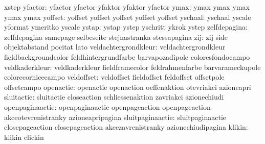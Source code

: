                           xstep                     %
                  yfactor: yfactor                   yfactor
                           yfaktor                   yfaktor
                           yfactor                   %
                     ymax: ymax                      ymax
                           ymax                      ymax
                           ymax                      %
                  yoffset: yoffset                   yoffset
                           yoffset                   yoffset
                           yoffset                   %
                  yschaal: yschaal                   yscale
                           yformat                   ymeritko
                           yscale                    %
                    ystap: ystap                     ystep
                           yschritt                  ykrok
                           ystep                     %
             zelfdepagina: zelfdepagina              samepage
                           selbeseite                stejnastranka
                           stessapagina
                      zij: zij                       side
                           objektabstand             pocitat
                           lato
     veldachtergrondkleur: veldachtergrondkleur      fieldbackgroundcolor
                           feldhintergrundfarbe      barvapozadipole
                           coloresfondocampo
           veldkaderkleur: veldkaderkleur            fieldframecolor
                           feldrahmenfarbe           barvarameckupole
                           colorecornicecampo
               veldoffset: veldoffset                fieldoffset
                           feldoffset                offsetpole
                           offsetcampo
                openactie: openactie                 openaction
                           oeffenaktion              otevriakci
                           azioneapri
               sluitactie: sluitactie                closeaction
                           schliessenaktion          zavriakci
                           azionechiudi
          openpaginaactie: openpaginaactie           openpageaction
                           openpageaction            akceotevrenistranky
                           azioneapripagina          %
         sluitpaginaactie: sluitpaginaactie          closepageaction
                           closepageaction           akcezavrenistranky
                           azionechiudipagina        %
                   klikin: klikin                    clickin
